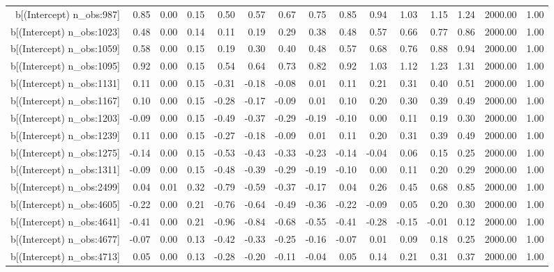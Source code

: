 \begin{table}[ht]
\begin{tabular}{rrrrrrrrrrrrrrr}
  b[(Intercept) n\_obs:987] & 0.85 & 0.00 & 0.15 & 0.50 & 0.57 & 0.67 & 0.75 & 0.85 & 0.94 & 1.03 & 1.15 & 1.24 & 2000.00 & 1.00 \\ 
  b[(Intercept) n\_obs:1023] & 0.48 & 0.00 & 0.14 & 0.11 & 0.19 & 0.29 & 0.38 & 0.48 & 0.57 & 0.66 & 0.77 & 0.86 & 2000.00 & 1.00 \\ 
  b[(Intercept) n\_obs:1059] & 0.58 & 0.00 & 0.15 & 0.19 & 0.30 & 0.40 & 0.48 & 0.57 & 0.68 & 0.76 & 0.88 & 0.94 & 2000.00 & 1.00 \\ 
  b[(Intercept) n\_obs:1095] & 0.92 & 0.00 & 0.15 & 0.54 & 0.64 & 0.73 & 0.82 & 0.92 & 1.03 & 1.12 & 1.23 & 1.31 & 2000.00 & 1.00 \\ 
  b[(Intercept) n\_obs:1131] & 0.11 & 0.00 & 0.15 & -0.31 & -0.18 & -0.08 & 0.01 & 0.11 & 0.21 & 0.31 & 0.40 & 0.51 & 2000.00 & 1.00 \\ 
  b[(Intercept) n\_obs:1167] & 0.10 & 0.00 & 0.15 & -0.28 & -0.17 & -0.09 & 0.01 & 0.10 & 0.20 & 0.30 & 0.39 & 0.49 & 2000.00 & 1.00 \\ 
  b[(Intercept) n\_obs:1203] & -0.09 & 0.00 & 0.15 & -0.49 & -0.37 & -0.29 & -0.19 & -0.10 & 0.00 & 0.11 & 0.19 & 0.30 & 2000.00 & 1.00 \\ 
  b[(Intercept) n\_obs:1239] & 0.11 & 0.00 & 0.15 & -0.27 & -0.18 & -0.09 & 0.01 & 0.11 & 0.20 & 0.31 & 0.39 & 0.49 & 2000.00 & 1.00 \\ 
  b[(Intercept) n\_obs:1275] & -0.14 & 0.00 & 0.15 & -0.53 & -0.43 & -0.33 & -0.23 & -0.14 & -0.04 & 0.06 & 0.15 & 0.25 & 2000.00 & 1.00 \\ 
  b[(Intercept) n\_obs:1311] & -0.09 & 0.00 & 0.15 & -0.48 & -0.39 & -0.29 & -0.19 & -0.10 & 0.00 & 0.11 & 0.20 & 0.29 & 2000.00 & 1.00 \\ 
  b[(Intercept) n\_obs:2499] & 0.04 & 0.01 & 0.32 & -0.79 & -0.59 & -0.37 & -0.17 & 0.04 & 0.26 & 0.45 & 0.68 & 0.85 & 2000.00 & 1.00 \\ 
  b[(Intercept) n\_obs:4605] & -0.22 & 0.00 & 0.21 & -0.76 & -0.64 & -0.49 & -0.36 & -0.22 & -0.09 & 0.05 & 0.20 & 0.30 & 2000.00 & 1.00 \\ 
  b[(Intercept) n\_obs:4641] & -0.41 & 0.00 & 0.21 & -0.96 & -0.84 & -0.68 & -0.55 & -0.41 & -0.28 & -0.15 & -0.01 & 0.12 & 2000.00 & 1.00 \\ 
  b[(Intercept) n\_obs:4677] & -0.07 & 0.00 & 0.13 & -0.42 & -0.33 & -0.25 & -0.16 & -0.07 & 0.01 & 0.09 & 0.18 & 0.25 & 2000.00 & 1.00 \\ 
  b[(Intercept) n\_obs:4713] & 0.05 & 0.00 & 0.13 & -0.28 & -0.20 & -0.11 & -0.04 & 0.05 & 0.14 & 0.21 & 0.31 & 0.37 & 2000.00 & 1.00 \\ 

\end{tabular}
\end{table}
